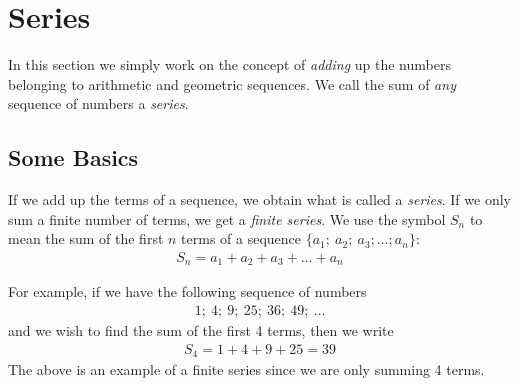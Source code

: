 

\section{Series}
\label{mp:se}
In this section we simply work on the concept of \textit{adding} up the numbers belonging to arithmetic and geometric sequences. We call the sum of \textit{any} sequence of numbers a \textit{series}.

\subsection{Some Basics}
If we add up the terms of a sequence, we obtain what is called a \textit{series}. If we only sum a finite number of terms, we get a \textit{finite series}. We use the symbol $S_n$ to mean the sum of the first $n$ terms of a sequence
$\{a_1; \: a_2; \: a_3; \ldots ; a_n \}$:
\begin{eqnarray}
S_n = a_1 + a_2 + a_3 + \ldots + a_n
\end{eqnarray}

For example, if we have the following sequence of numbers
\begin{eqnarray*}
1; \: 4; \: 9; \: 25; \: 36; \: 49; \: \ldots
\end{eqnarray*}
and we wish to find the sum of the first 4 terms, then we write
\begin{eqnarray*}
S_4 = 1 + 4 + 9 + 25 = 39
\end{eqnarray*}
The above is an example of a finite series since we are only summing 4 terms.

